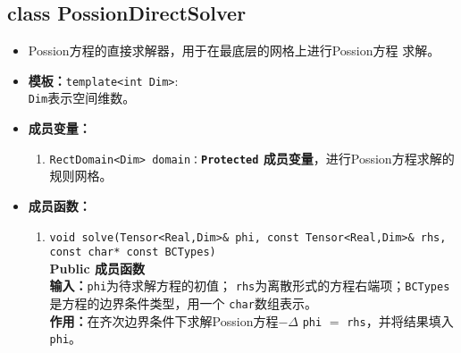 \documentclass[a4paper,twoside]{ctexart}
\begin{document}
 \subsection*{class PossionDirectSolver}
\begin{itemize}
    \item Possion方程的直接求解器，用于在最底层的网格上进行Possion方程
      求解。
    \item \textbf{模板：}\texttt{template<int Dim>}:\\
    \texttt{Dim}表示空间维数。
     \item \textbf{成员变量：}
        \begin{enumerate}[(1)]
            \item \texttt{RectDomain<Dim>
                domain：}\textbf{\texttt{Protected}  成员变量}，进行Possion方程求解的规则网格。
        \end{enumerate}
    \item \textbf{成员函数：}
        \begin{enumerate}[(1)]
            \item \texttt{void solve(Tensor<Real,Dim>\& phi, const Tensor<Real,Dim>\&
                rhs, const char* const BCTypes)}\\
              \textbf{Public 成员函数}\\
            \textbf{输入：}\texttt{phi}为待求解方程的初值；
            \texttt{rhs}为离散形式的方程右端项；\texttt{BCTypes}是方程的边界条件类型，用一个
            \texttt{char}数组表示。\\
            \textbf{作用：}在齐次边界条件下求解Possion方程$-\Delta$ \texttt{phi} $=$
            \texttt{rhs}，并将结果填入\texttt{phi}。
        \end{enumerate}
\end{itemize}
\end{document}
